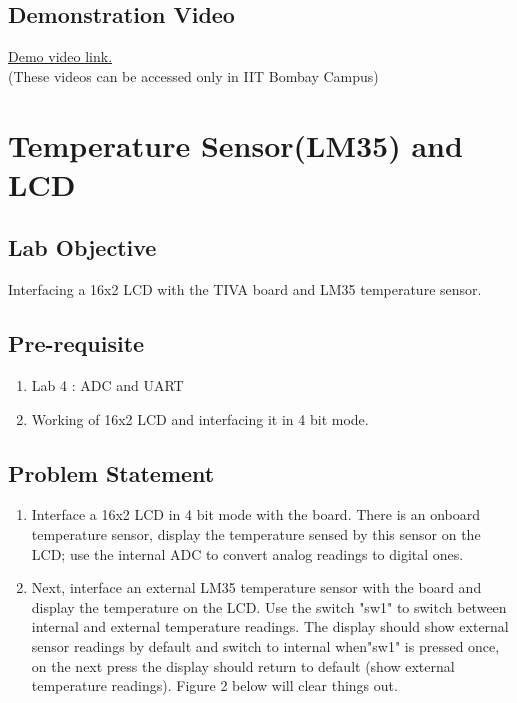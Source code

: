 \documentclass[a4paper,12pt,oneside]{book}
\begin{document}
\section{Demonstration Video} 
\href{http://10.129.139.139/videos/Lab4.html}{Demo video link.}\\
(These videos can be accessed only in IIT Bombay Campus)

\chapter{Temperature Sensor(LM35) and LCD}

\section{Lab Objective}
Interfacing a 16x2 LCD with the TIVA board and LM35 temperature sensor.


\section{Pre-requisite}
\begin{enumerate}
\item 
Lab 4 : ADC and UART
\item Working of 16x2 LCD and interfacing it in 4 bit mode.
\end{enumerate}


\section{Problem Statement}

\begin{enumerate}
\item 
Interface a 16x2 LCD in 4 bit mode with the board. There is an onboard temperature sensor, display the temperature sensed by this sensor on the LCD; use the internal ADC to convert analog readings to digital ones.
\item
Next, interface an external LM35 temperature sensor with the board and display the temperature on the LCD. Use the switch "sw1" to switch between internal and external temperature readings. The display should show external sensor readings by default and switch to internal when"sw1" is pressed once, on the next press the display should return to default (show external temperature readings). Figure 2 below will clear things out.
\end{enumerate}
\end{document}
